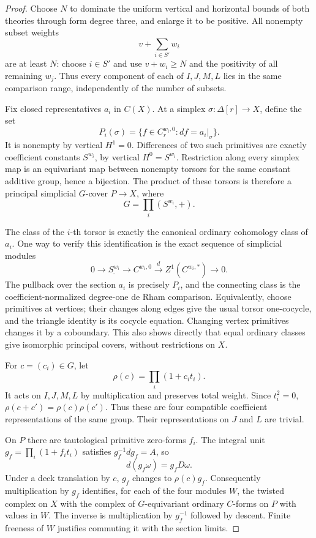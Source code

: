 \begin{proof}
Choose \(N\) to dominate the uniform vertical and horizontal bounds of
both theories through form degree three, and enlarge it to be positive.
All nonempty subset weights
\[
                      v+\sum_{i\in S'}w_i
\]
are at least \(N\): choose \(i\in S'\) and use
\(v+w_i\geq N\) and the positivity of all remaining \(w_j\).
Thus every component of each of \(I,J,M,L\) lies in the same comparison
range, independently of the number of subsets.

Fix closed representatives \(a_i\) in \(C(X)\).
At a simplex \(\sigma:\Delta[r]\to X\), define the set
\[
 P_i(\sigma)=\{f\in C_r^{w_i,0}:df=a_i|_\sigma\}.
\]
It is nonempty by vertical \(H^1=0\).
Differences of two such primitives are exactly coefficient constants
\(S^{w_i}\), by vertical \(H^0=S^{w_i}\).
Restriction along every simplex map is an equivariant map between
nonempty torsors for the same constant additive group, hence a bijection.
The product of these torsors is therefore a principal simplicial
\(G\)-cover \(P\to X\), where
\[
                         G=\prod_i(S^{w_i},+).
\]

The class of the \(i\)-th torsor is exactly the canonical ordinary
cohomology class of \(a_i\).
One way to verify this identification is the exact sequence of
simplicial modules
\[
 0\longrightarrow\underline{S^{w_i}}\longrightarrow C^{w_i,0}
          \xrightarrow{d}Z^1(C^{w_i,*})\longrightarrow0.
\]
The pullback over the section \(a_i\) is precisely \(P_i\), and the
connecting class is the coefficient-normalized degree-one de Rham
comparison. Equivalently, choose primitives at vertices; their changes
along edges give the usual torsor one-cocycle, and the triangle identity
is its cocycle equation. Changing vertex primitives changes it by a
coboundary. This also shows directly that equal ordinary classes give
isomorphic principal covers, without restrictions on \(X\).

For \(c=(c_i)\in G\), let
\[
                         \rho(c)=\prod_i(1+c_it_i).
\]
It acts on \(I,J,M,L\) by multiplication and preserves total weight.
Since \(t_i^2=0\), \(\rho(c+c')=\rho(c)\rho(c')\).
Thus these are four compatible coefficient representations of the
same group. Their representations on \(J\) and \(L\) are trivial.

On \(P\) there are tautological primitive zero-forms \(f_i\).
The integral unit \(g_f=\prod_i(1+f_it_i)\) satisfies
\(g_f^{-1}dg_f=A\), so
\[
                         d(g_f\omega)=g_fD\omega .
\]
Under a deck translation by \(c\), \(g_f\) changes to \(\rho(c)g_f\).
Consequently multiplication by \(g_f\) identifies, for each of the four
modules \(W\), the twisted complex on \(X\) with the complex of
\(G\)-equivariant ordinary \(C\)-forms on \(P\) with values in \(W\).
The inverse is multiplication by \(g_f^{-1}\) followed by descent.
Finite freeness of \(W\) justifies commuting it with the section limits.


\end{proof}
